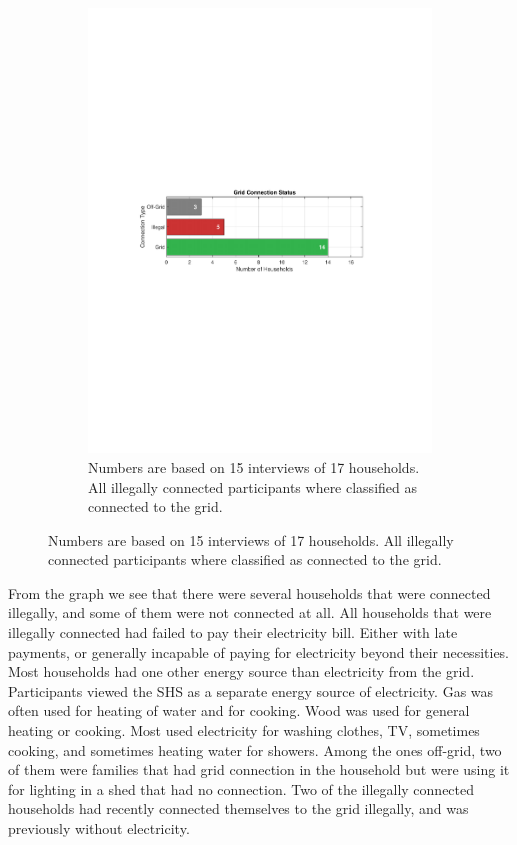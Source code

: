\begin{figure}[H]
    \hfill
    \begin{subfigure}[b]{0.48\textwidth}
        \centering
        \includegraphics[width=\textwidth]{photos/GridConnection.pdf}
        \caption{Numbers are based on 15 interviews of 17 households. All illegally connected participants where classified as connected to the grid.}
        \label{res:soc:gridconnection}
    \end{subfigure}
\end{figure}
From the graph we see that there were several households that were connected illegally, and some of them were not connected at all. All households that were illegally connected had failed to pay their electricity bill. Either with late payments, or generally incapable of paying for electricity beyond their necessities. Most households had one other energy source than electricity from the grid. Participants viewed the SHS as a separate energy source of electricity. Gas was often used for heating of water and for cooking. Wood was used for general heating or cooking. Most used electricity for washing clothes, TV, sometimes cooking, and sometimes heating water for showers. Among the ones off-grid, two of them were families that had grid connection in the household but were using it for lighting in a shed that had no connection. Two of the illegally connected households had recently connected themselves to the grid illegally, and was previously without electricity. 

